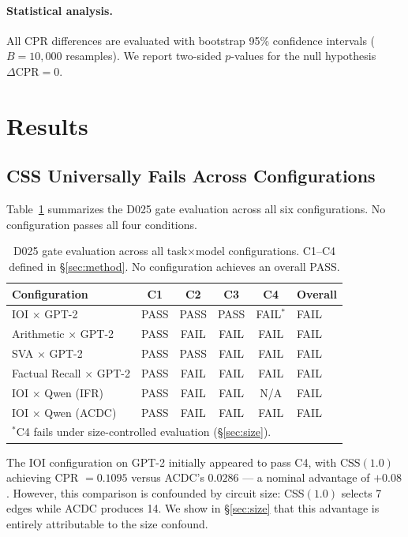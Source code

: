 \documentclass[11pt,a4paper]{article}
\begin{document}
\paragraph{Statistical analysis.}
All CPR differences are evaluated with bootstrap 95\% confidence intervals ($B{=}10{,}000$ resamples). We report two-sided $p$-values for the null hypothesis $\Delta\text{CPR} = 0$.

\section{Results}
\label{sec:results}

\subsection{CSS Universally Fails Across Configurations}
\label{sec:universal}

Table~\ref{tab:main} summarizes the D025 gate evaluation across all six configurations. No configuration passes all four conditions.

\begin{table}[t]
\centering
\small
\caption{D025 gate evaluation across all task$\times$model configurations. C1--C4 defined in \S\ref{sec:method}. No configuration achieves an overall PASS.}
\label{tab:main}
\begin{tabular}{lccccl}
\toprule
\textbf{Configuration} & \textbf{C1} & \textbf{C2} & \textbf{C3} & \textbf{C4} & \textbf{Overall} \\
\midrule
IOI $\times$ GPT-2            & PASS & PASS & PASS & FAIL$^*$   & FAIL \\
Arithmetic $\times$ GPT-2     & PASS & FAIL & FAIL & FAIL       & FAIL \\
SVA $\times$ GPT-2            & PASS & PASS & FAIL & FAIL       & FAIL \\
Factual Recall $\times$ GPT-2 & PASS & FAIL & FAIL & FAIL       & FAIL \\
IOI $\times$ Qwen (IFR)       & PASS & FAIL & FAIL & N/A        & FAIL \\
IOI $\times$ Qwen (ACDC)      & PASS & FAIL & FAIL & FAIL       & FAIL \\
\bottomrule
\multicolumn{6}{l}{\footnotesize $^*$C4 fails under size-controlled evaluation (\S\ref{sec:size}).}
\end{tabular}
\end{table}

The IOI configuration on GPT-2 initially appeared to pass C4, with $\text{CSS}(1.0)$ achieving CPR $= 0.1095$ versus ACDC's $0.0286$ --- a nominal advantage of $+0.08$. However, this comparison is confounded by circuit size: CSS$(1.0)$ selects 7 edges while ACDC produces 14. We show in \S\ref{sec:size} that this advantage is entirely attributable to the size confound.
\end{document}
